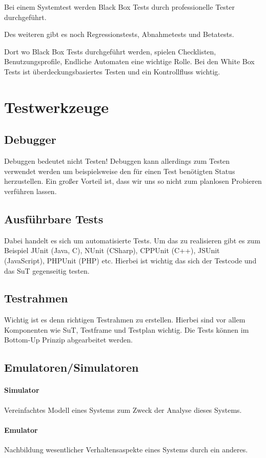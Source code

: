 Bei einem Systemtest werden Black Box Tests durch professionelle Tester durchgeführt.

Des weiteren gibt es noch Regressionstests, Abnahmetests und Betatests. 

Dort wo Black Box Tests durchgeführt werden, spielen Checklisten, Benutzungsprofile, Endliche Automaten eine wichtige Rolle. Bei den White Box Tests ist überdeckungsbasiertes Testen und ein Kontrollfluss wichtig. 

\section{Testwerkzeuge}
\subsection{Debugger}
Debuggen bedeutet nicht Testen! Debuggen kann allerdings zum Testen verwendet werden um beispielsweise den für einen Test benötigten Status herzustellen. Ein großer Vorteil ist, dass wir uns so nicht zum planlosen Probieren verführen lassen.

\subsection{Ausführbare Tests}
Dabei handelt es sich um automatisierte Tests. Um das zu realisieren gibt es zum Beispiel JUnit (Java, C), NUnit (CSharp), CPPUnit (C++), JSUnit (JavaScript), PHPUnit (PHP) etc.
Hierbei ist wichtig das sich der Testcode und das SuT gegenseitig testen.
 
\subsection{Testrahmen}
Wichtig ist es denn richtigen Testrahmen zu erstellen. Hierbei sind vor allem Komponenten wie SuT, Testframe und Testplan wichtig. Die Tests können im Bottom-Up Prinzip abgearbeitet werden.

\subsection{Emulatoren/Simulatoren}
\paragraph{Simulator}
Vereinfachtes Modell eines Systems zum Zweck der Analyse dieses Systems.
\paragraph{Emulator}
Nachbildung wesentlicher Verhaltensaspekte eines Systems durch ein anderes.

